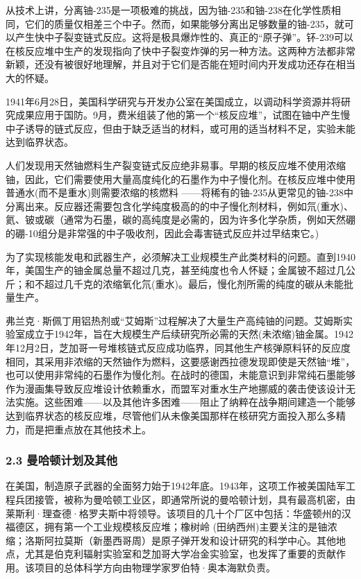 从技术上讲，分离铀-235是一项极难的挑战，因为铀-235和铀-238在化学性质相同，它们的质量仅相差三个中子。然而，如果能够分离出足够数量的铀-235，就可以产生快中子裂变链式反应。这将是极具爆炸性的、真正的“原子弹”。钚-239可以在核反应堆中生产的发现指向了快中子裂变炸弹的另一种方法。这两种方法都非常新颖，还没有被很好地理解，并且对于它们是否能在短时间内开发成功还存在相当大的怀疑。

1941年6月28日，美国科学研究与开发办公室在美国成立，以调动科学资源并将研究成果应用于国防。9月，费米组装了他的第一个“核反应堆”，试图在铀中产生慢中子诱导的链式反应，但由于缺乏适当的材料，或可用的适当材料不足，实验未能达到临界状态。

人们发现用天然铀燃料生产裂变链式反应绝非易事。早期的核反应堆不使用浓缩铀，因此，它们需要使用大量高度纯化的石墨作为中子慢化剂。在核反应堆中使用普通水(而不是重水)则需要浓缩的核燃料 ——将稀有的铀-235从更常见的铀-238中分离出来。反应器还需要包含化学纯度极高的的中子慢化剂材料，例如氘(重水)、氦、铍或碳（通常为石墨，碳的高纯度是必需的，因为许多化学杂质，例如天然硼的硼-10组分是非常强的中子吸收剂，因此会毒害链式反应并过早结束它。)

为了实现核能发电和武器生产，必须解决工业规模生产此类材料的问题。直到1940年，美国生产的铀金属总量不超过几克，甚至纯度也令人怀疑；金属铍不超过几公斤；和不超过几千克的浓缩氧化氘(重水)。最后，慢化剂所需的纯度的碳从未能批量生产。

弗兰克·斯佩丁用铝热剂或“艾姆斯”过程解决了大量生产高纯铀的问题。艾姆斯实验室成立于1942年，旨在大规模生产后续研究所必需的天然(未浓缩)铀金属。1942年12月2日，芝加哥一号堆核链式反应成功临界，同其他生产核弹原料钚的反应度相同，其采用非浓缩的天然铀作为燃料，这要感谢西拉德发现即使是天然铀“堆”，也可以使用非常纯的石墨作为慢化剂。在战时的德国，未能意识到非常纯石墨能够作为漫画集导致反应堆设计依赖重水，而盟军对重水生产地挪威的袭击使该设计无法实施。这些困难——以及其他许多困难——阻止了纳粹在战争期间建造一个能够达到临界状态的核反应堆，尽管他们从未像美国那样在核研究方面投入那么多精力，而是把重点放在其他技术上。

\subsubsection{2.3 曼哈顿计划及其他}
在美国，制造原子武器的全面努力始于1942年底。1943年，这项工作被美国陆军工程兵团接管，被称为曼哈顿工业区，即通常所说的曼哈顿计划，具有最高机密，由莱斯利·理查德·格罗夫斯中将领导。该项目的几十个厂区中包括：华盛顿州的汉福德区，拥有第一个工业规模核反应堆；橡树岭 (田纳西州)主要关注的是铀浓缩；洛斯阿拉莫斯（新墨西哥周）是原子弹开发和设计研究的科学中心。其他地点，尤其是伯克利辐射实验室和芝加哥大学冶金实验室，也发挥了重要的贡献作用。该项目的总体科学方向由物理学家罗伯特·奥本海默负责。

